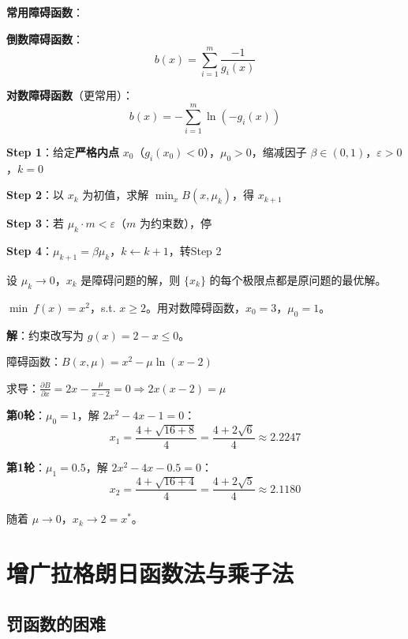 \textbf{常用障碍函数}：

\textbf{倒数障碍函数}：
\[
b(x) = \sum_{i=1}^{m} \frac{-1}{g_i(x)}
\]

\textbf{对数障碍函数}（更常用）：
\[
b(x) = -\sum_{i=1}^{m} \ln(-g_i(x))
\]

\begin{algobox}[内点法算法]
\textbf{Step 1}：给定\textbf{严格内点} $x_0$（$g_i(x_0) < 0$），$\mu_0 > 0$，缩减因子 $\beta \in (0, 1)$，$\varepsilon > 0$，$k = 0$

\textbf{Step 2}：以 $x_k$ 为初值，求解 $\min_x B(x, \mu_k)$，得 $x_{k+1}$

\textbf{Step 3}：若 $\mu_k \cdot m < \varepsilon$（$m$ 为约束数），停

\textbf{Step 4}：$\mu_{k+1} = \beta \mu_k$，$k \leftarrow k+1$，转Step 2
\end{algobox}

\begin{theorem}[内点法收敛性]
设 $\mu_k \to 0$，$x_k$ 是障碍问题的解，则 $\{x_k\}$ 的每个极限点都是原问题的最优解。
\end{theorem}

\begin{example}\label{ex:interior}
$\min\ f(x) = x^2$，s.t. $x \geq 2$。用对数障碍函数，$x_0 = 3$，$\mu_0 = 1$。

\textbf{解}：约束改写为 $g(x) = 2 - x \leq 0$。

障碍函数：$B(x, \mu) = x^2 - \mu \ln(x - 2)$

求导：$\frac{\partial B}{\partial x} = 2x - \frac{\mu}{x-2} = 0 \Rightarrow 2x(x-2) = \mu$

\textbf{第0轮}：$\mu_0 = 1$，解 $2x^2 - 4x - 1 = 0$：
\[
x_1 = \frac{4 + \sqrt{16+8}}{4} = \frac{4 + 2\sqrt{6}}{4} \approx 2.2247
\]

\textbf{第1轮}：$\mu_1 = 0.5$，解 $2x^2 - 4x - 0.5 = 0$：
\[
x_2 = \frac{4 + \sqrt{16+4}}{4} = \frac{4 + 2\sqrt{5}}{4} \approx 2.1180
\]

随着 $\mu \to 0$，$x_k \to 2 = x^*$。
\end{example}

\section{增广拉格朗日函数法与乘子法}\label{sec:augmented-lagrangian}

\subsection{罚函数的困难}

